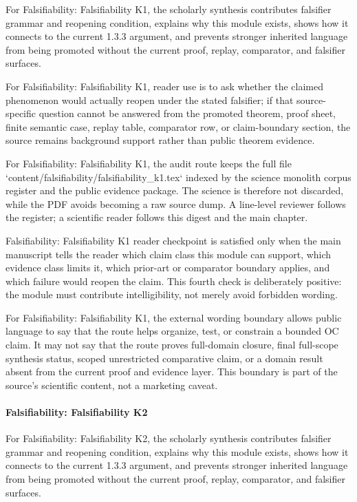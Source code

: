 For Falsifiability: Falsifiability K1, the scholarly synthesis contributes falsifier grammar and reopening condition, explains why this module exists, shows how it connects to the current 1.3.3 argument, and prevents stronger inherited language from being promoted without the current proof, replay, comparator, and falsifier surfaces.


For Falsifiability: Falsifiability K1, reader use is to ask whether the claimed phenomenon would actually reopen under the stated falsifier; if that source-specific question cannot be answered from the promoted theorem, proof sheet, finite semantic case, replay table, comparator row, or claim-boundary section, the source remains background support rather than public theorem evidence.


For Falsifiability: Falsifiability K1, the audit route keeps the full file `content/falsifiability/falsifiability\_k1.tex` indexed by the science monolith corpus register and the public evidence package. The science is therefore not discarded, while the PDF avoids becoming a raw source dump. A line-level reviewer follows the register; a scientific reader follows this digest and the main chapter.


Falsifiability: Falsifiability K1 reader checkpoint is satisfied only when the main manuscript tells the reader which claim class this module can support, which evidence class limits it, which prior-art or comparator boundary applies, and which failure would reopen the claim. This fourth check is deliberately positive: the module must contribute intelligibility, not merely avoid forbidden wording.


For Falsifiability: Falsifiability K1, the external wording boundary allows public language to say that the route helps organize, test, or constrain a bounded OC claim. It may not say that the route proves full-domain closure, final full-scope synthesis status, scoped unrestricted comparative claim, or a domain result absent from the current proof and evidence layer. This boundary is part of the source's scientific content, not a marketing caveat.


\paragraph{Falsifiability: Falsifiability K2}

For Falsifiability: Falsifiability K2, the scholarly synthesis contributes falsifier grammar and reopening condition, explains why this module exists, shows how it connects to the current 1.3.3 argument, and prevents stronger inherited language from being promoted without the current proof, replay, comparator, and falsifier surfaces.


